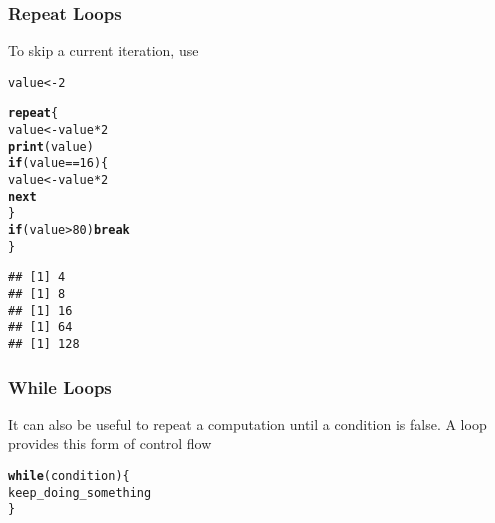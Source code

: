 \documentclass[12pt]{beamer}\usepackage[]{graphicx}\usepackage[]{color}
\makeatletter
\newcommand{\hlnum}[1]{\textcolor[rgb]{0.686,0.059,0.569}{#1}}%
\newcommand{\hlopt}[1]{\textcolor[rgb]{0,0,0}{#1}}%
\newcommand{\hlstd}[1]{\textcolor[rgb]{0.345,0.345,0.345}{#1}}%
\newcommand{\hlkwa}[1]{\textcolor[rgb]{0.161,0.373,0.58}{\textbf{#1}}}%
\newcommand{\hlkwb}[1]{\textcolor[rgb]{0.69,0.353,0.396}{#1}}%
\newcommand{\hlkwd}[1]{\textcolor[rgb]{0.737,0.353,0.396}{\textbf{#1}}}%
\newenvironment{kframe}{%
 \def\at@end@of@kframe{}%
 \ifinner\ifhmode%
  \def\at@end@of@kframe{\end{minipage}}%
  \begin{minipage}{\columnwidth}%
 \fi\fi%
 \def\FrameCommand##1{\hskip\@totalleftmargin \hskip-\fboxsep
 \colorbox{shadecolor}{##1}\hskip-\fboxsep
     \hskip-\linewidth \hskip-\@totalleftmargin \hskip\columnwidth}%
 \MakeFramed {\advance\hsize-\width
   \@totalleftmargin\z@ \linewidth\hsize
   \@setminipage}}%
 {\par\unskip\endMakeFramed%
 \at@end@of@kframe}
\newenvironment{knitrout}{}{} %
\makeatother
\begin{document}

\begin{frame}[fragile]
\frametitle{Repeat Loops}

To skip a current iteration, use 
\begin{knitrout}\footnotesize
{}\color{fgcolor}\begin{kframe}
\begin{alltt}
\hlstd{value} \hlkwb{<-} \hlnum{2}

\hlkwa{repeat} \hlstd{\{}
  \hlstd{value} \hlkwb{<-} \hlstd{value} \hlopt{*} \hlnum{2}
  \hlkwd{print}\hlstd{(value)}
  \hlkwa{if} \hlstd{(value} \hlopt{==} \hlnum{16}\hlstd{) \{}
    \hlstd{value} \hlkwb{<-} \hlstd{value} \hlopt{*} \hlnum{2}
    \hlkwa{next}
  \hlstd{\}}
  \hlkwa{if} \hlstd{(value} \hlopt{>} \hlnum{80}\hlstd{)} \hlkwa{break}
\hlstd{\}}
\end{alltt}
\begin{verbatim}
## [1] 4
## [1] 8
## [1] 16
## [1] 64
## [1] 128
\end{verbatim}
\end{kframe}
\end{knitrout}

\end{frame}


\begin{frame}
\begin{center}
\Huge{}
\end{center}
\end{frame}


\begin{frame}[fragile]
\frametitle{While Loops}

It can also be useful to repeat a computation until a condition is false. A  loop provides this form of control flow
\begin{knitrout}\footnotesize
{}\color{fgcolor}\begin{kframe}
\begin{alltt}
\hlkwa{while} \hlstd{(condition) \{}
  \hlstd{keep_doing_something}
\hlstd{\}}
\end{alltt}
\end{kframe}
\end{knitrout}
\end{frame}
\end{document}
